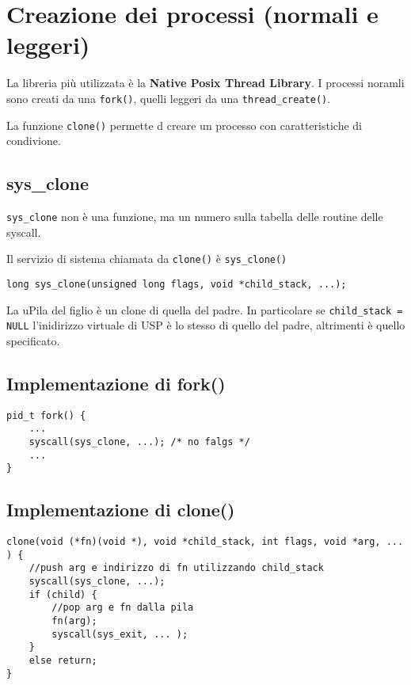 \documentclass[12pt, a4paper]{report}
\begin{document}
\section{Creazione dei processi (normali e leggeri)}
La libreria più utilizzata è la \textbf{Native Posix Thread Library}.
I processi noramli sono creati da una \texttt{fork()}, quelli leggeri da una
\texttt{thread\_create()}.

La funzione  \texttt{clone()} permette d creare un processo con caratteristiche
di condivione.

\subsection{sys\_clone}
\texttt{sys\_clone} non è una funzione, ma un numero sulla tabella delle
routine delle syscall.

Il servizio di sistema chiamata da \texttt{clone()} è \texttt{sys\_clone()}
\begin{verbatim}
long sys_clone(unsigned long flags, void *child_stack, ...);
\end{verbatim}
La uPila del figlio è un clone di quella del padre. In particolare se
\texttt{child\_stack = NULL} l'inidirizzo virtuale di USP è lo stesso di quello
del padre, altrimenti è quello specificato.

\subsection{Implementazione di fork()}
\begin{verbatim}
pid_t fork() {
    ...
    syscall(sys_clone, ...); /* no falgs */
    ...
}
\end{verbatim}

\subsection{Implementazione di clone()}
\begin{verbatim}
clone(void (*fn)(void *), void *child_stack, int flags, void *arg, ... ) {
    //push arg e indirizzo di fn utilizzando child_stack
    syscall(sys_clone, ...);
    if (child) {
        //pop arg e fn dalla pila
        fn(arg);
        syscall(sys_exit, ... );
    }
    else return;
}
\end{verbatim}
\end{document}
